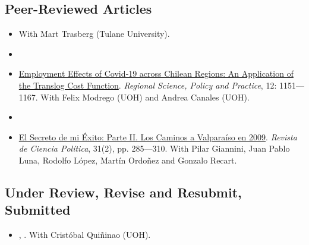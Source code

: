 \subsection*{Peer-Reviewed Articles}


\begin{itemize}

	\item[\textcolor{gray}{\textbullet}] {\unskip} With Mart Trasberg (Tulane University).

	\item[\textcolor{gray}{\textbullet}] \unskip

	\item[\textcolor{gray}{\textbullet}] \href{https://doi.org/10.1111/rsp3.12337}{Employment Effects of Covid‐19 across Chilean Regions: An Application of the Translog Cost Function}. \emph{Regional Science, Policy and Practice}, 12: 1151---1167. With Felix Modrego (UOH) and Andrea Canales (UOH).

	\item[\textcolor{gray}{\textbullet}] \unskip

	\item[\textcolor{gray}{\textbullet}] \href{https://scielo.conicyt.cl/pdf/revcipol/v31n2/art07.pdf}{El Secreto de mi \'Exito: Parte II. Los Caminos a Valpara\'iso en 2009}. \emph{Revista de Ciencia Pol\'itica}, 31(2), pp. 285---310. With Pilar Giannini, Juan Pablo Luna, Rodolfo L\'opez, Mart\'in Ordo\~nez and Gonzalo Recart.
  
\end{itemize}

\subsection*{Under Review, Revise and Resubmit, Submitted}

	\begin{itemize}

		\item[\textcolor{gray}{\textbullet}] \href{https://github.com/hbahamonde/Conjoint_US/raw/master/Bahamonde_Quininao_Conjoint_Letter_PA.pdf}{\unskip}, {\bf \emph{\unskip}}. With Crist\'obal Qui\~ninao (UOH).

  	\end{itemize}



